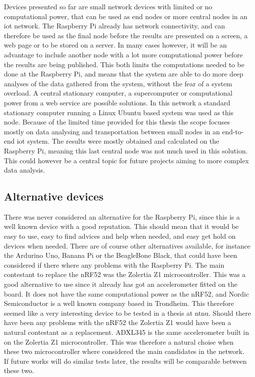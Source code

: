 Devices presented so far are small network devices with limited or no computational power, that can be used as end nodes or more central nodes in an \gls{iot} network. The Raspberry Pi already has network connectivity, and can therefore be used as the final node before the results are presented on a screen, a web page or to be stored on a server. In many cases however, it will be an advantage to include another node with a lot more computational power before the results are being published. This both limits the computations needed to be done at the Raspberry Pi, and means that the system are able to do more deep analyses of the data gathered from the system, without the fear of a system overload. A central stationary computer, a supercomputer or computational power from a web service are possible solutions. In this network a standard stationary computer running a Linux Ubuntu based system was used as this node. Because of the limited time provided for this thesis the scope focuses mostly on data analysing and transportation between small nodes in an end-to-end \gls{iot} system. The results were mostly obtained and calculated on the Raspberry Pi, meaning this last central node was not much used in this solution. This could however be a central topic for future projects aiming to more complex data analysis. 

\subsection{Alternative devices}

There was never considered an alternative for the Raspberry Pi, since this is a well known device with a good reputation. This should mean that it would be easy to use, easy to find advices and help when needed, and easy get hold on devices when needed. There are of course other alternatives available, for instance the Ardurino Uno, Banana Pi or the BeagleBone Black, that could have been considered if there where any problems with the Raspberry Pi. The main contestant to replace the nRF52 was the Zolertia Z1 microcontroller. This was a good alternative to use since it already has got an accelerometer fitted on the board. It does not have the same computational power as the nRF52, and Nordic Semiconductor is a well known company based in Trondheim. This therefore seemed like a very interesting device to be tested in a thesis at \gls{ntnu}. Should there have been any problems with the nRF52 the Zolertia Z1 would have been a natural contestant as a replacement. ADXL345 is the same accelerometer built in on the Zolertia Z1 microcontroller. This was therefore a natural choise when these two microcontroller where considered the main candidates in the network. If future works will do similar tests later, the results will be comparable between these two. 


